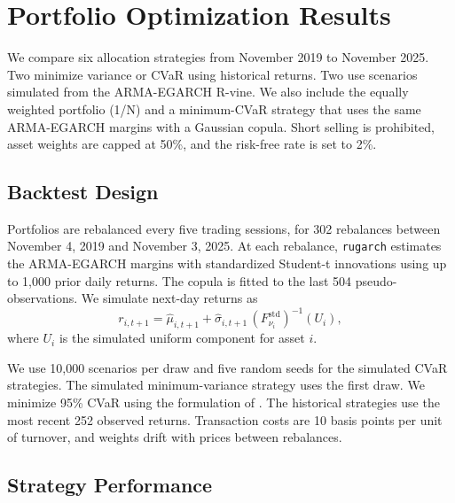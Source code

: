 \section{Portfolio Optimization Results}\label{sec:allocation}
\begin{correction}

We compare six allocation strategies from November 2019 to November 2025. Two minimize variance or CVaR using historical returns. Two use scenarios simulated from the ARMA-EGARCH R-vine. We also include the equally weighted portfolio (1/N) and a minimum-CVaR strategy that uses the same ARMA-EGARCH margins with a Gaussian copula. Short selling is prohibited, asset weights are capped at 50\%, and the risk-free rate is set to 2\%.

\subsection{Backtest Design}

Portfolios are rebalanced every five trading sessions, for 302 rebalances between November 4, 2019 and November 3, 2025. At each rebalance, \texttt{rugarch} estimates the ARMA-EGARCH margins with standardized Student-t innovations using up to 1,000 prior daily returns. The copula is fitted to the last 504 pseudo-observations. We simulate next-day returns as
\[
r_{i,t+1} = \hat\mu_{i,t+1} + \hat\sigma_{i,t+1}\,(F^{\mathrm{std}}_{\nu_i})^{-1}(U_i),
\]
where \(U_i\) is the simulated uniform component for asset \(i\).

We use 10,000 scenarios per draw and five random seeds for the simulated CVaR strategies. The simulated minimum-variance strategy uses the first draw. We minimize 95\% CVaR using the formulation of \citet{rockafellar2000}. The historical strategies use the most recent 252 observed returns. Transaction costs are 10 basis points per unit of turnover, and weights drift with prices between rebalances.

\subsection{Strategy Performance}


\end{correction}
